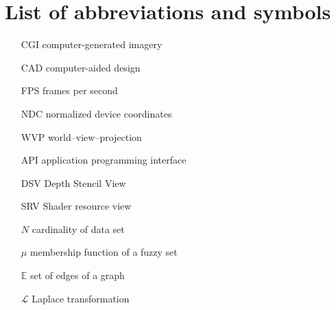 \chapter{List of abbreviations and symbols}

\begin{itemize}
\item[CGI] computer-generated imagery
\item[CAD] computer-aided design
\item[FPS] frames per second

\item[NDC] normalized device coordinates
\item[WVP] world--view--projection
\item[API] application programming interface
\item[DSV] Depth Stencil View
\item[SRV] Shader resource view

\item[$N$] cardinality of data set
\item[$\mu$] membership function of a fuzzy set
\item[$\mathbb{E}$] set of edges of a graph
\item[$\mathcal{L}$] Laplace transformation
\end{itemize}